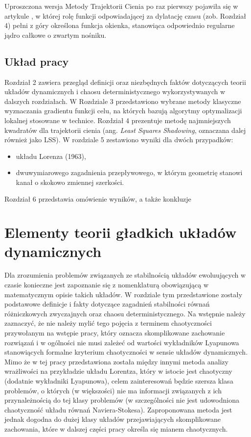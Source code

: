 \documentclass[12pt]{article}
\begin{document}
Uproszczona wersja Metody Trajektorii Cienia po raz pierwszy pojawiła się w artykule \cite{Chater}, w której rolę funkcji odpowiadającej za dylatację czasu (zob. Rozdział 4) pełni z góry określona funkcja okienka, stanowiąca odpowiednio regularne jądro całkowe o zwartym nośniku. 
\subsection{Układ pracy}
Rozdział 2 zawiera przegląd definicji oraz niezbędnych faktów dotyczących teorii układów dynamicznych i chaosu deterministycznego wykorzystywanych w dalszych rozdziałach. W Rozdziale 3 przedstawiono wybrane metody klasyczne wyznaczania gradientu funkcji celu, na których bazują algorytmy optymalizacji lokalnej stosowane w technice.  Rozdział 4 prezentuje metodę najmniejszych kwadratów dla trajektorii cienia (ang. \textit{Least Squares Shadowing}, oznaczana dalej również jako LSS). W rozdziale 5 zestawiono wyniki dla dwóch przypadków:
\begin{itemize}
	\item układu Lorenza (1963),
	\item dwuwymiarowego zagadnienia przepływowego, w którym geometrię stanowi kanał o skokowo zmiennej szerkości.
\end{itemize}
Rozdział 6 przedstawia omówienie wyników, a także konkluzje
\newpage
\section{Elementy teorii gładkich układów dynamicznych}
Dla zrozumienia problemów związanych ze stabilnością układów ewoluujących w czasie konieczne jest zapoznanie się z nomenklaturą obowiązującą w matematycznym opisie takich układów. W rozdziale tym przedstawione zostały podstawowe definicje i fakty dotyczące zagadnień stabilności równań różniczkowych zwyczajnych oraz chaosu deterministycznego. Na wstępnie należy zaznaczyć, że nie należy mylić tego pojęcia z terminem chaotyczności przywołanym na wstępie pracy, który oznacza skomplikowane zachowanie rozwiązań i w ogólności nie musi zależeć od wartości wykładników Lyapunowa stanowiących formalne kryterium chaotyczności w sensie układów dynamicznych. Mimo że w tej pracy przedstawiona została między innymi metoda analizy wrażliwości na przykładzie układu Lorentza, który w istocie jest chaotyczny (dodatnie wykładniki Lyapunowa), celem zainteresowań będzie szersza klasa problemów, o których (w większości) nie ma informacji związanych z ich przynależnością do tej klasy problemów (w szczególności nie jest udowodniona chaotyczność układu równań Naviera-Stokesa). Zaproponowana metoda jest jednak dogodna do dużej klasy układów przejawiających skomplikowane zachowania, które w dalszej części pracy określa się mianem chaotycznych.\newline
\end{document}

